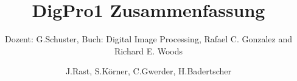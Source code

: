 \documentclass{scrartcl}
\title{DigPro1 Zusammenfassung}
\subtitle{Dozent: G.Schuster, Buch: Digital Image Processing, Rafael C. Gonzalez and Richard E. Woods}
\author{J.Rast, S.Körner, C.Gwerder, H.Badertscher}
\numberwithin{equation}{section}
\begin{document}

\begin{titlepage}
	\maketitle
	\thispagestyle{empty}
\end{titlepage}

\newpage
\tableofcontents
\newpage




\newpage

\newpage




% 


\end{document}
